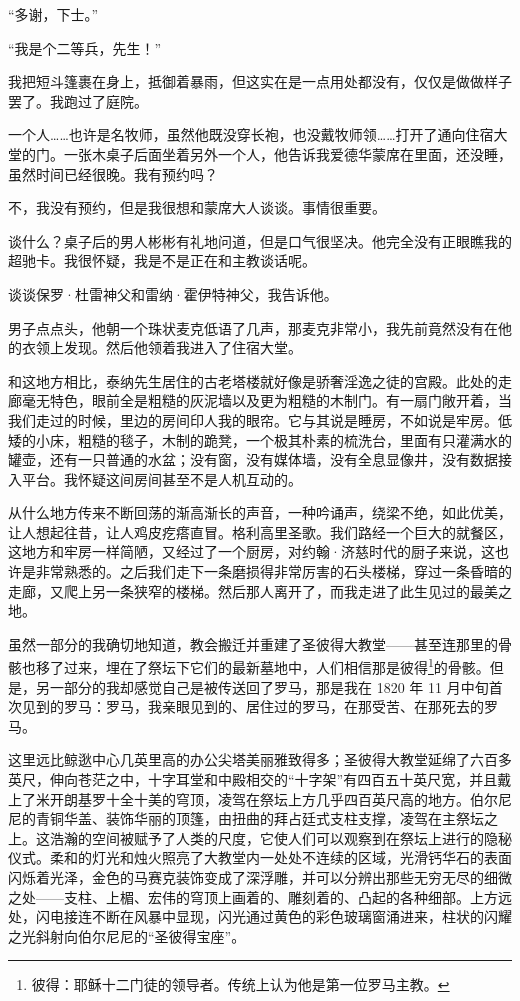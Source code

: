 \documentclass[AutoFakeBold=true]{book}
\begin{document}
``多谢，下士。''

``我是个二等兵，先生！''

我把短斗篷裹在身上，抵御着暴雨，但这实在是一点用处都没有，仅仅是做做样子罢了。我跑过了庭院。

\vspace*{1em}

一个人……也许是名牧师，虽然他既没穿长袍，也没戴牧师领……打开了通向住宿大堂的门。一张木桌子后面坐着另外一个人，他告诉我爱德华蒙席在里面，还没睡，虽然时间已经很晚。我有预约吗？

不，我没有预约，但是我很想和蒙席大人谈谈。事情很重要。

谈什么？桌子后的男人彬彬有礼地问道，但是口气很坚决。他完全没有正眼瞧我的超驰卡。我很怀疑，我是不是正在和主教谈话呢。

谈谈保罗·杜雷神父和雷纳·霍伊特神父，我告诉他。

男子点点头，他朝一个珠状麦克低语了几声，那麦克非常小，我先前竟然没有在他的衣领上发现。然后他领着我进入了住宿大堂。

和这地方相比，泰纳先生居住的古老塔楼就好像是骄奢淫逸之徒的宫殿。此处的走廊毫无特色，眼前全是粗糙的灰泥墙以及更为粗糙的木制门。有一扇门敞开着，当我们走过的时候，里边的房间印人我的眼帘。它与其说是睡房，不如说是牢房。低矮的小床，粗糙的毯子，木制的跪凳，一个极其朴素的梳洗台，里面有只灌满水的罐壶，还有一只普通的水盆；没有窗，没有媒体墙，没有全息显像井，没有数据接入平台。我怀疑这间房间甚至不是人机互动的。

从什么地方传来不断回荡的渐高渐长的声音，一种吟诵声，绕梁不绝，如此优美，让人想起往昔，让人鸡皮疙瘩直冒。格利高里圣歌。我们路经一个巨大的就餐区，这地方和牢房一样简陋，又经过了一个厨房，对约翰·济慈时代的厨子来说，这也许是非常熟悉的。之后我们走下一条磨损得非常厉害的石头楼梯，穿过一条昏暗的走廊，又爬上另一条狭窄的楼梯。然后那人离开了，而我走进了此生见过的最美之地。

虽然一部分的我确切地知道，教会搬迁并重建了圣彼得大教堂——甚至连那里的骨骸也移了过来，埋在了祭坛下它们的最新墓地中，人们相信那是彼得\footnote{彼得：耶稣十二门徒的领导者。传统上认为他是第一位罗马主教。}的骨骸。但是，另一部分的我却感觉自己是被传送回了罗马，那是我在 1820 年 11 月中旬首次见到的罗马：罗马，我亲眼见到的、居住过的罗马，在那受苦、在那死去的罗马。

这里远比鲸逖中心几英里高的办公尖塔美丽雅致得多；圣彼得大教堂延绵了六百多英尺，伸向苍茫之中，十字耳堂和中殿相交的``十字架''有四百五十英尺宽，并且戴上了米开朗基罗十全十美的穹顶，凌驾在祭坛上方几乎四百英尺高的地方。伯尔尼尼的青铜华盖、装饰华丽的顶篷，由扭曲的拜占廷式支柱支撑，凌驾在主祭坛之上。这浩瀚的空间被赋予了人类的尺度，它使人们可以观察到在祭坛上进行的隐秘仪式。柔和的灯光和烛火照亮了大教堂内一处处不连续的区域，光滑钙华石的表面闪烁着光泽，金色的马赛克装饰变成了深浮雕，并可以分辨出那些无穷无尽的细微之处——支柱、上楣、宏伟的穹顶上画着的、雕刻着的、凸起的各种细部。上方远处，闪电接连不断在风暴中显现，闪光通过黄色的彩色玻璃窗涌进来，柱状的闪耀之光斜射向伯尔尼尼的``圣彼得宝座''。
\end{document}
